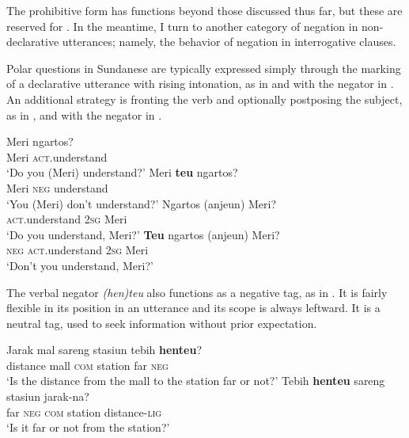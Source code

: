 \documentclass[output=paper]{langscibook}
\begin{document}
The prohibitive form has functions beyond those discussed thus far, but these are reserved for . In the meantime, I turn to another category of negation in non-declarative utterances; namely, the behavior of negation in interrogative clauses.

Polar questions in Sundanese are typically expressed simply through the marking of a declarative utterance with rising intonation, as in  and with the negator in . An additional strategy is fronting the verb and optionally postposing the subject, as in , and with the negator in . 

 
\ea\label{ex:sun:16}
    \ea\label{ex:sun:16a}
        \gll  Meri ngartos?\\ 
              Meri \textsc{act}.understand\\
        \glt ‘Do you (Meri) understand?’
    \ex\label{ex:sun:16b}
        \gll  Meri \textbf{teu} ngartos?\\
              Meri \textsc{neg} understand\\
        \glt ‘You (Meri) don't understand?’
    \ex\label{ex:sun:16c}
        \gll  Ngartos (anjeun) Meri?\\
             \textsc{act}.understand \textsc{2sg} Meri\\
        \glt ‘Do you understand, Meri?’
    \ex\label{ex:sun:16d}
        \gll  \textbf{Teu} ngartos (anjeun) Meri?\\
              \textsc{neg} \textsc{act}.understand \textsc{2sg} Meri\\
        \glt ‘Don't you understand, Meri?’
    \z
\z 

The verbal negator \textit{(hen)teu} also functions as a negative tag, as in . It is fairly flexible in its position in an utterance and its scope is always leftward. It is a neutral tag, used to seek information without prior expectation. 
 
\ea\label{ex:sun:17}
    \ea\label{ex:sun:17a}
        \gll  Jarak mal sareng stasiun tebih \textbf{henteu}?\\ 
              distance mall \textsc{com} station far \textsc{neg}\\
        \glt ‘Is the distance from the mall to the station far or not?’
    \ex\label{ex:sun:17b}
        \gll  Tebih \textbf{henteu} sareng stasiun jarak-na?\\
              far \textsc{neg} \textsc{com} station distance-\textsc{lig}\\
        \glt ‘Is it far or not from the station?’
    \z
\z 
\end{document}
